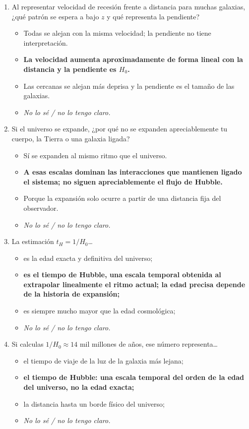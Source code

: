 \begin{enumerate}[leftmargin=*]
\item Al representar velocidad de recesión frente a distancia para muchas galaxias, ¿qué patrón se espera a bajo $z$ y qué representa la pendiente?
\begin{itemize}
\item Todas se alejan con la misma velocidad; la pendiente no tiene interpretación.
\item \textbf{La velocidad aumenta aproximadamente de forma lineal con la distancia y la pendiente es $H_0$.}
\item Las cercanas se alejan más deprisa y la pendiente es el tamaño de las galaxias.
\item \textit{No lo sé / no lo tengo claro.}
\end{itemize}

\item Si el universo se expande, ¿por qué no se expanden apreciablemente tu cuerpo, la Tierra o una galaxia ligada?
\begin{itemize}
\item Sí se expanden al mismo ritmo que el universo.
\item \textbf{A esas escalas dominan las interacciones que mantienen ligado el sistema; no siguen apreciablemente el flujo de Hubble.}
\item Porque la expansión solo ocurre a partir de una distancia fija del observador.
\item \textit{No lo sé / no lo tengo claro.}
\end{itemize}

\item La estimación $t_H=1/H_0$\ldots
\begin{itemize}
\item es la edad exacta y definitiva del universo;
\item \textbf{es el tiempo de Hubble, una escala temporal obtenida al extrapolar linealmente el ritmo actual; la edad precisa depende de la historia de expansión;}
\item es siempre mucho mayor que la edad cosmológica;
\item \textit{No lo sé / no lo tengo claro.}
\end{itemize}

\item Si calculas $1/H_0\approx14$ mil millones de años, ese número representa\ldots
\begin{itemize}
\item el tiempo de viaje de la luz de la galaxia más lejana;
\item \textbf{el tiempo de Hubble: una escala temporal del orden de la edad del universo, no la edad exacta;}
\item la distancia hasta un borde físico del universo;
\item \textit{No lo sé / no lo tengo claro.}
\end{itemize}


\end{enumerate}
